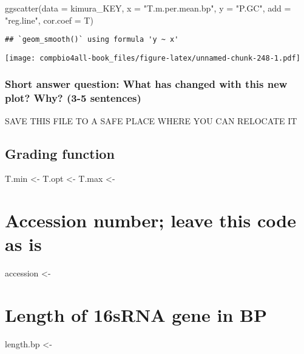 \documentclass[
]{book}
\newenvironment{Shaded}{\begin{snugshade}}{\end{snugshade}}
\newcommand{\AttributeTok}[1]{\textcolor[rgb]{0.77,0.63,0.00}{#1}}
\newcommand{\FunctionTok}[1]{\textcolor[rgb]{0.00,0.00,0.00}{#1}}
\newcommand{\NormalTok}[1]{#1}
\newcommand{\StringTok}[1]{\textcolor[rgb]{0.31,0.60,0.02}{#1}}
\begin{document}
\begin{Shaded}
\begin{Highlighting}[]
\FunctionTok{ggscatter}\NormalTok{(}\AttributeTok{data =}\NormalTok{ kimura\_KEY,}
         \AttributeTok{x =} \StringTok{"T.m.per.mean.bp"}\NormalTok{,}
         \AttributeTok{y =} \StringTok{"P.GC"}\NormalTok{,}
         \AttributeTok{add =} \StringTok{"reg.line"}\NormalTok{,}
         \AttributeTok{cor.coef =}\NormalTok{ T)}
\end{Highlighting}
\end{Shaded}

\begin{verbatim}
## `geom_smooth()` using formula 'y ~ x'
\end{verbatim}

\texttt{[image: compbio4all-book\_files/figure-latex/unnamed-chunk-248-1.pdf]}

\hypertarget{short-answer-question-what-has-changed-with-this-new-plot-why-3-5-sentences}{%
\subsection{Short answer question: What has changed with this new plot? Why? (3-5 sentences)}\label{short-answer-question-what-has-changed-with-this-new-plot-why-3-5-sentences}}

SAVE THIS FILE TO A SAFE PLACE WHERE YOU CAN RELOCATE IT

\hypertarget{grading-function}{%
\section{Grading function}\label{grading-function}}

T.min \textless-
T.opt \textless-
T.max \textless-

\hypertarget{accession-number-leave-this-code-as-is}{%
\chapter{Accession number; leave this code as is}\label{accession-number-leave-this-code-as-is}}

accession \textless-

\hypertarget{length-of-16srna-gene-in-bp}{%
\chapter{Length of 16sRNA gene in BP}\label{length-of-16srna-gene-in-bp}}

length.bp \textless-
\end{document}
